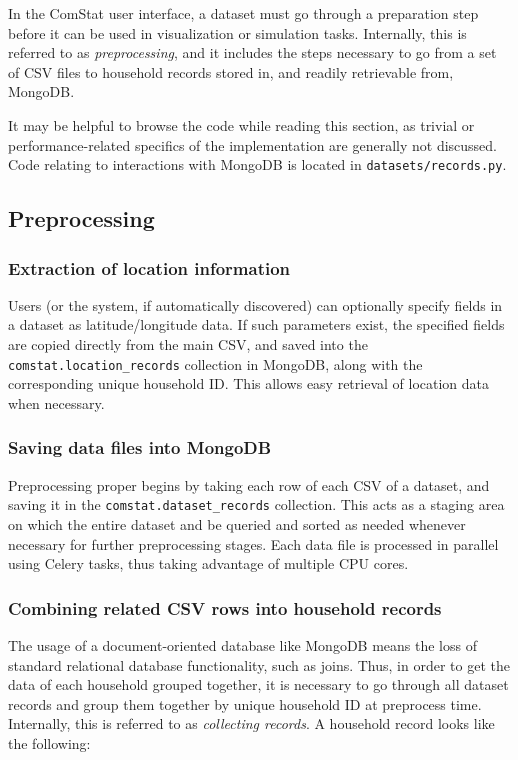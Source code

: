 In the ComStat user interface, a dataset must go through a preparation step before it can be used in visualization or simulation tasks. Internally, this is referred to as \emph{preprocessing}, and it includes the steps necessary to go from a set of CSV files to household records stored in, and readily retrievable from, MongoDB.

It may be helpful to browse the code while reading this section, as trivial or performance-related specifics of the implementation are generally not discussed. Code relating to interactions with MongoDB is located in \texttt{datasets/records.py}.


\subsection{Preprocessing}

\subsubsection{Extraction of location information}

Users (or the system, if automatically discovered) can optionally specify fields in a dataset as latitude/longitude data. If such parameters exist, the specified fields are copied directly from the main CSV, and saved into the \texttt{comstat.location\_records} collection in MongoDB, along with the corresponding unique household ID. This allows easy retrieval of location data when necessary.

\subsubsection{Saving data files into MongoDB}

Preprocessing proper begins by taking each row of each CSV of a dataset, and saving it in the \texttt{comstat.dataset\_records} collection. This acts as a staging area on which the entire dataset and be queried and sorted as needed whenever necessary for further preprocessing stages. Each data file is processed in parallel using Celery tasks, thus taking advantage of multiple CPU cores.

\subsubsection{Combining related CSV rows into household records}

The usage of a document-oriented database like MongoDB means the loss of standard relational database functionality, such as joins. Thus, in order to get the data of each household grouped together, it is necessary to go through all dataset records and group them together by unique household ID at preprocess time. Internally, this is referred to as \emph{collecting records}. A household record looks like the following:

